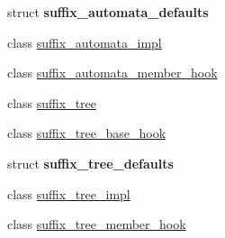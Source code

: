 \begin{DoxyCompactItemize}
\item 
struct {\bfseries suffix\+\_\+automata\+\_\+defaults}
\item 
class \hyperlink{classboost_1_1intrusive_1_1suffix__automata__impl}{suffix\+\_\+automata\+\_\+impl}
\item 
class \hyperlink{classboost_1_1intrusive_1_1suffix__automata__member__hook}{suffix\+\_\+automata\+\_\+member\+\_\+hook}
\item 
class \hyperlink{classboost_1_1intrusive_1_1suffix__tree}{suffix\+\_\+tree}
\item 
class \hyperlink{classboost_1_1intrusive_1_1suffix__tree__base__hook}{suffix\+\_\+tree\+\_\+base\+\_\+hook}
\item 
struct {\bfseries suffix\+\_\+tree\+\_\+defaults}
\item 
class \hyperlink{classboost_1_1intrusive_1_1suffix__tree__impl}{suffix\+\_\+tree\+\_\+impl}
\item 
class \hyperlink{classboost_1_1intrusive_1_1suffix__tree__member__hook}{suffix\+\_\+tree\+\_\+member\+\_\+hook}
\end{DoxyCompactItemize}
